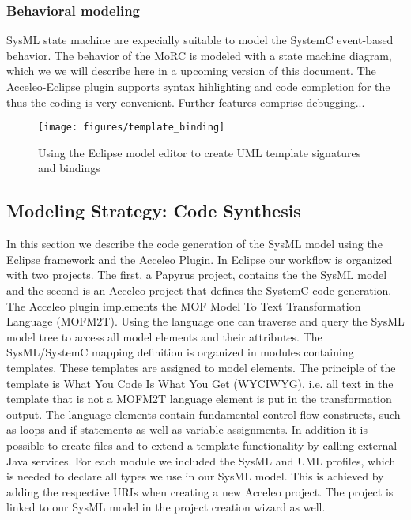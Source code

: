 \documentclass{template/openetcs_article}
\begin{document}
\subsubsection{Behavioral modeling}

SysML state machine are expecially suitable to model the SystemC event-based behavior.
The behavior of the MoRC is modeled with a state machine diagram, which we we will describe here in a upcoming version of this document.
The Acceleo-Eclipse plugin supports syntax hihlighting and code completion for the thus the coding is very convenient.
Further features comprise debugging...

\begin{figure}
\begin{center}
\texttt{[image: figures/template\_binding]}
\end{center}
\caption{Using the Eclipse model editor to create UML template signatures and bindings}
\label{fig:eclipseTemplates}
\end{figure}

\subsection{Modeling Strategy: Code Synthesis}

In this section we describe the code generation of the SysML model using the Eclipse framework and the Acceleo Plugin.
In Eclipse our workflow is organized with two projects. The first, a Papyrus project, contains the the SysML model and the second is an Acceleo project that defines the SystemC code generation. The Acceleo plugin implements the MOF Model To Text Transformation Language (MOFM2T). Using the language one can traverse and query the SysML model tree to access all model elements and their attributes. The SysML/SystemC mapping definition is organized in modules containing templates. These templates are assigned to model elements. The principle of the template is What You Code Is What You Get (WYCIWYG), i.e. all text in the template that is not a MOFM2T language element is put in the transformation output. The language elements contain fundamental control flow constructs, such as loops and if statements as well as variable assignments. In addition it is possible to create files and to extend a template functionality by calling external Java services. For each module we included the SysML and UML profiles, which is needed to declare all types we use in our SysML model. This is achieved by adding the respective URIs when creating a new Acceleo project. The project is linked to our SysML model in the project creation wizard as well.\\
\end{document}
